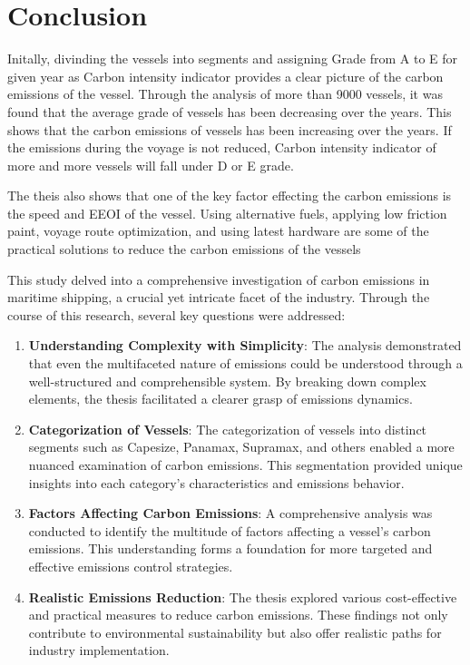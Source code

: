 \chapter{Conclusion}

Initally, divinding the vessels into segments and assigning Grade from A to E for given year as Carbon intensity indicator provides a clear picture of the carbon emissions of the vessel.
Through the analysis of more than 9000 vessels, it was found that the average grade of vessels has been decreasing over the years. 
This shows that the carbon emissions of vessels has been increasing over the years.
If the emissions during the voyage is not reduced, Carbon intensity indicator of more and more vessels will fall under D or E grade. 

The theis also shows that one of the key factor effecting the carbon emissions is the speed and EEOI of the vessel.
Using alternative fuels, applying low friction paint, voyage route optimization, and using latest hardware are some of the practical solutions to reduce the carbon emissions of the vessels


This study delved into a comprehensive investigation of carbon emissions in maritime shipping, a crucial yet intricate facet of the industry. Through the course of this research, several key questions were addressed:

\begin{enumerate}
    \item \textbf{Understanding Complexity with Simplicity}: The analysis demonstrated that even the multifaceted nature of emissions could be understood through a well-structured and comprehensible system. By breaking down complex elements, the thesis facilitated a clearer grasp of emissions dynamics.
    \item \textbf{Categorization of Vessels}: The categorization of vessels into distinct segments such as Capesize, Panamax, Supramax, and others enabled a more nuanced examination of carbon emissions. This segmentation provided unique insights into each category's characteristics and emissions behavior.
    \item \textbf{Factors Affecting Carbon Emissions}: A comprehensive analysis was conducted to identify the multitude of factors affecting a vessel's carbon emissions. This understanding forms a foundation for more targeted and effective emissions control strategies.
    \item \textbf{Realistic Emissions Reduction}: The thesis explored various cost-effective and practical measures to reduce carbon emissions. These findings not only contribute to environmental sustainability but also offer realistic paths for industry implementation.
\end{enumerate}

